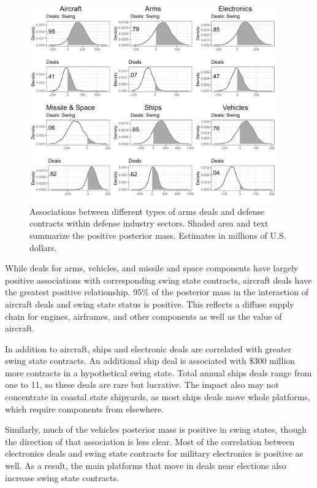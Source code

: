 \documentclass[12pt]{article}
\begin{document}
\begin{figure}[htpb]
	\centering
		\includegraphics[width=0.95\textwidth]{../figures/me-deals-sector.png}
	\caption{Associations between different types of arms deals and defense contracts within defense industry sectors. Shaded area and text summarize the positive posterior mass. Estimates in millions of U.S. dollars.}
	\label{fig:me-deals-sector}
\end{figure}


While deals for arms, vehicles, and missile and space components have largely positive associations with corresponding swing state contracts, aircraft deals have the greatest positive relationship. 
95\% of the posterior mass in the interaction of aircraft deals and swing state status is positive.
This reflects a diffuse supply chain for engines, airframes, and other components as well as the value of aircraft.


In addition to aircraft, ships and electronic deals are correlated with greater swing state contracts. 
An additional ship deal is associated with \$300 million more contracts in a hypothetical swing state. 
Total annual ships deals range from one to 11, so these deals are rare but lucrative. 
The impact also may not concentrate in coastal state shipyards, as most ships deals move whole platforms, which require components from elsewhere. 


Similarly, much of the vehicles posterior mass is positive in swing states, though the direction of that association is less clear.
Most of the correlation between electronics deals and swing state contracts for military electronics is positive as well.
As a result, the main platforms that move in deals near elections also increase swing state contracts. 
\end{document}
